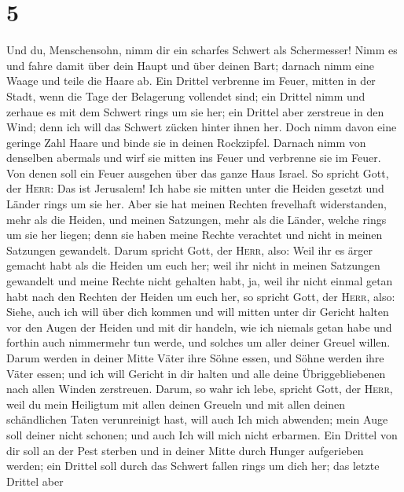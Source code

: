 \hypertarget{section-4}{%
\section{5}\label{section-4}}

 Und du, Menschensohn, nimm dir ein scharfes Schwert als
Schermesser! Nimm es und fahre damit über dein Haupt und über deinen
Bart; darnach nimm eine Waage und teile die Haare ab.  Ein
Drittel verbrenne im Feuer, mitten in der Stadt, wenn die Tage der
Belagerung vollendet sind; ein Drittel nimm und zerhaue es mit dem
Schwert rings um sie her; ein Drittel aber zerstreue in den Wind; denn
ich will das Schwert zücken hinter ihnen her.  Doch nimm
davon eine geringe Zahl Haare und binde sie in deinen Rockzipfel.
 Darnach nimm von denselben abermals und wirf sie mitten
ins Feuer und verbrenne sie im Feuer. Von denen soll ein Feuer ausgehen
über das ganze Haus Israel.  So spricht Gott, der
\textsc{Herr}: Das ist Jerusalem! Ich habe sie mitten unter die Heiden
gesetzt und Länder rings um sie her.  Aber sie hat meinen
Rechten frevelhaft widerstanden, mehr als die Heiden, und meinen
Satzungen, mehr als die Länder, welche rings um sie her liegen; denn sie
haben meine Rechte verachtet und nicht in meinen Satzungen gewandelt.
 Darum spricht Gott, der \textsc{Herr}, also: Weil ihr es
ärger gemacht habt als die Heiden um euch her; weil ihr nicht in meinen
Satzungen gewandelt und meine Rechte nicht gehalten habt, ja, weil ihr
nicht einmal getan habt nach den Rechten der Heiden um euch her, so
spricht Gott, der \textsc{Herr}, also:  Siehe, auch ich
will über dich kommen und will mitten unter dir Gericht halten vor den
Augen der Heiden  und mit dir handeln, wie ich niemals
getan habe und forthin auch nimmermehr tun werde, und solches um aller
deiner Greuel willen.  Darum werden in deiner Mitte Väter
ihre Söhne essen, und Söhne werden ihre Väter essen; und ich will
Gericht in dir halten und alle deine Übriggebliebenen nach allen Winden
zerstreuen.  Darum, so wahr ich lebe, spricht Gott, der
\textsc{Herr}, weil du mein Heiligtum mit allen deinen Greueln und mit
allen deinen schändlichen Taten verunreinigt hast, will auch Ich mich
abwenden; mein Auge soll deiner nicht schonen; und auch Ich will mich
nicht erbarmen.  Ein Drittel von dir soll an der Pest
sterben und in deiner Mitte durch Hunger aufgerieben werden; ein Drittel
soll durch das Schwert fallen rings um dich her; das letzte Drittel aber
